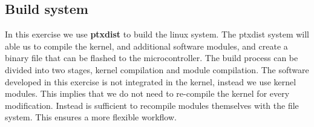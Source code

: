 \subsection{Build system}
In this exercise we use {\bf ptxdist} to build the linux system. The ptxdist system will able us to compile the kernel, and additional software modules, and create a binary file that can be flashed to the microcontroller. The build process can be divided into two stages, kernel compilation and module compilation. The software developed in this exercise is not integrated in the kernel, instead we use kernel modules. This implies that we do not need to re-compile the kernel for every modification. Instead is sufficient to recompile modules themselves with the file system. This ensures a more flexible workflow.  



 